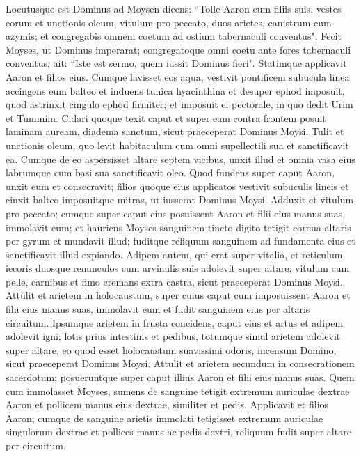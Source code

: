 \begin{biblechapter}  
\verse Locutusque est Dominus ad Moysen dicens: 
\verse “Tolle Aaron cum filiis suis, vestes eorum et unctionis oleum, vitulum pro peccato, duos arietes, canistrum cum azymis; 
\verse et congregabis omnem coetum ad ostium tabernaculi conventus". 
\verse Fecit Moyses, ut Dominus imperarat; congregatoque omni coetu ante fores tabernaculi conventus, 
\verse ait: “Iste est sermo, quem iussit Dominus fieri". 
\verse Statimque applicavit Aaron et filios eius. Cumque lavisset eos aqua, 
\verse vestivit pontificem subucula linea accingens eum balteo et induens tunica hyacinthina et desuper ephod imposuit, 
\verse quod astrinxit cingulo ephod firmiter; et imposuit ei pectorale, in quo dedit Urim et Tummim. 
\verse Cidari quoque texit caput et super eam contra frontem posuit laminam auream, diadema sanctum, sicut praeceperat Dominus Moysi. 
\verse Tulit et unctionis oleum, quo levit habitaculum cum omni supellectili sua et sanctificavit ea. 
\verse Cumque de eo aspersisset altare septem vicibus, unxit illud et omnia vasa eius labrumque cum basi sua sanctificavit oleo. 
\verse Quod fundens super caput Aaron, unxit eum et consecravit; 
\verse filios quoque eius applicatos vestivit subuculis lineis et cinxit balteo imposuitque mitras, ut iusserat Dominus Moysi. 
\verse Adduxit et vitulum pro peccato; cumque super caput eius posuissent Aaron et filii eius manus suas, 
\verse immolavit eum; et hauriens Moyses sanguinem tincto digito tetigit cornua altaris per gyrum et mundavit illud; fuditque reliquum sanguinem ad fundamenta eius et sanctificavit illud expiando. 
\verse Adipem autem, qui erat super vitalia, et reticulum iecoris duosque renunculos cum arvinulis suis adolevit super altare; 
\verse vitulum cum pelle, carnibus et fimo cremans extra castra, sicut praeceperat Dominus Moysi. 
\verse Attulit et arietem in holocaustum, super cuius caput cum imposuissent Aaron et filii eius manus suas, 
\verse immolavit eum et fudit sanguinem eius per altaris circuitum. 
\verse Ipsumque arietem in frusta concidens, caput eius et artus et adipem adolevit igni; 
\verse lotis prius intestinis et pedibus, totumque simul arietem adolevit super altare, eo quod esset holocaustum suavissimi odoris, incensum Domino, sicut praeceperat Dominus Moysi. 
\verse Attulit et arietem secundum in consecrationem sacerdotum; posueruntque super caput illius Aaron et filii eius manus suas. 
\verse Quem cum immolasset Moyses, sumens de sanguine tetigit extremum auriculae dextrae Aaron et pollicem manus eius dextrae, similiter et pedis. 
\verse Applicavit et filios Aaron; cumque de sanguine arietis immolati tetigisset extremum auriculae singulorum dextrae et pollices manus ac pedis dextri, reliquum fudit super altare per circuitum.  

\end{biblechapter}
